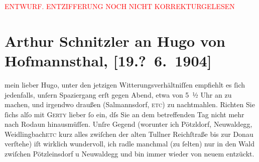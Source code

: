 
\begin{center}
            \textcolor{red}{ENTWURF. ENTZIFFERUNG NOCH NICHT KORREKTURGELESEN}
                      \end{center}
            
               \section[Arthur Schnitzler an Hugo von Hofmannsthal, {[}19.? 6. 1904{]}]{ Arthur Schnitzler an Hugo von Hofmannsthal, {[}19.? 6. 1904{]}}\nopagebreak{}\rehead{ }\begin{ledgroupsized}[t]{13cm}\normalsize\beginnumbering{} \toendnotes[C]{\smallbreak\pagebreak[2]} 
\toendnotes[C]{\smallbreak}\pstart{}{\pb}mein lieber Hugo, \pend\pstart
           unter den jetzigen Witterungsverhältniſſen empfiehlt es ſich jedenfalls, unſern
               Spaziergang erſt gegen Abend, etwa von 5 ½ Uhr an zu
               machen, und irgendwo draußen (Salmannsdorf, \textsc{etc}) zu nachtmahlen. Richten Sie ſichs alſo mit \textsc{Gerty} lieber ſo ein, dſs Sie an dem betreffenden Tag nicht mehr nach Rodaun hinausmüſſen. Unſre Gegend (worunter ich Pötzldorf, Neuwaldegg, {\pb}Weidlingbach\textsc{etc} kurz alles zwiſchen der alten Tullner Reichſtraße bis zur Donau verſtehe) iſt wirklich wundervoll, ich radle manchmal (zu
               ſelten) nur in den Wald zwiſchen Pötzleinsdorf u Neuwaldegg und bin immer wieder von neuem entzückt.

\end{ledgroupsized}
